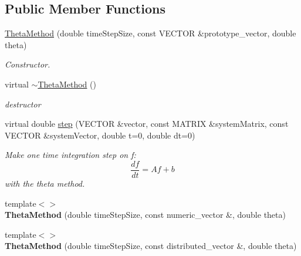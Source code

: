 \subsection*{Public Member Functions}
\begin{DoxyCompactItemize}
\item 
\hyperlink{classnatrium_1_1ThetaMethod_a7b5ec1aa8b646768c45cc422651ec905}{ThetaMethod} (double timeStepSize, const VECTOR \&prototype\_\-vector, double theta)
\begin{DoxyCompactList}\small\item\em Constructor. \item\end{DoxyCompactList}\item 
\hypertarget{classnatrium_1_1ThetaMethod_ac742c678ab9674722295585f10d27279}{
virtual \hyperlink{classnatrium_1_1ThetaMethod_ac742c678ab9674722295585f10d27279}{$\sim$ThetaMethod} ()}
\label{classnatrium_1_1ThetaMethod_ac742c678ab9674722295585f10d27279}

\begin{DoxyCompactList}\small\item\em destructor \item\end{DoxyCompactList}\item 
virtual double \hyperlink{classnatrium_1_1ThetaMethod_a247c639f49a05904dae01b05115bc7e4}{step} (VECTOR \&vector, const MATRIX \&systemMatrix, const VECTOR \&systemVector, double t=0, double dt=0)
\begin{DoxyCompactList}\small\item\em Make one time integration step on f: \[ \frac{df}{dt} = Af+b \] with the theta method. \item\end{DoxyCompactList}\item 
\hypertarget{classnatrium_1_1ThetaMethod_abbab4d93f6d54e1b82ea8cc008eba126}{
{\footnotesize template$<$$>$ }\\{\bfseries ThetaMethod} (double timeStepSize, const numeric\_\-vector \&, double theta)}
\label{classnatrium_1_1ThetaMethod_abbab4d93f6d54e1b82ea8cc008eba126}

\item 
\hypertarget{classnatrium_1_1ThetaMethod_a8ab913e8242378d6877ef6dcee80aebb}{
{\footnotesize template$<$$>$ }\\{\bfseries ThetaMethod} (double timeStepSize, const distributed\_\-vector \&, double theta)}
\label{classnatrium_1_1ThetaMethod_a8ab913e8242378d6877ef6dcee80aebb}


\end{DoxyCompactItemize}

